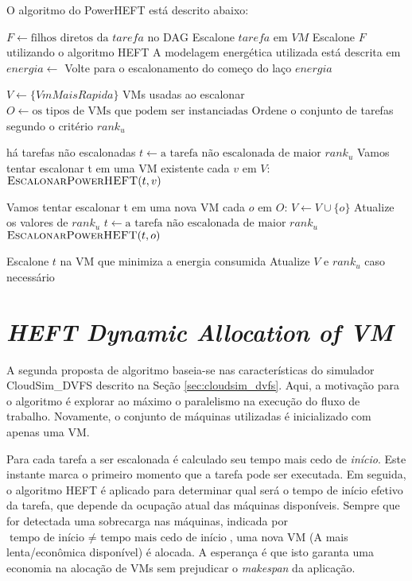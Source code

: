 O algoritmo do PowerHEFT está descrito abaixo:

\begin{codebox}
	\li $F \gets \text{filhos diretos da } tarefa \text{ no DAG}$
    \li Escalone $tarefa$ em $VM$
	\li Escalone $F$ utilizando o algoritmo \textsc{HEFT}
	\zi
	\li \Comment A modelagem energética utilizada está descrita em
    	\cite{guerout:energy_aware_simulation}
	\li $energia \gets$ 
		\li Volte para o escalonamento do começo do laço
	\li \Return $energia$
\end{codebox}


\begin{codebox}
	\li $V \gets \{VmMaisRapida\}$ \Comment VMs usadas ao escalonar
	\li $O \gets \text{os tipos de VMs que podem ser instanciadas}$
	\li Ordene o conjunto de tarefas segundo o critério $rank_u$
   
	\li \While há tarefas não escalonadas
		\li \Do $t \gets \text{a tarefa não escalonada de maior } rank_u$
		\zi
	    \li \Comment Vamos tentar escalonar t em uma VM existente
	    \li \For cada $v$ em $V$:
		    \li \Do	$\textnormal{\scshape EscalonarPowerHEFT}(t, v)$
	    \End
	    
	    \zi
	    \li \Comment Vamos tentar escalonar t em uma nova VM
	    \li \For cada $o$ em $O$:
		    \li \Do	$V \gets V \cup \{o\}$
		    \li Atualize os valores de $rank_u$
		    \li $t \gets \text{a tarefa não escalonada de maior } rank_u$
		    \li $\textnormal{\scshape EscalonarPowerHEFT}(t, o)$
	    \End
	    
	    \li Escalone $t$ na VM que minimiza a energia consumida
	    \li Atualize $V$ e $rank_u$ caso necessário
	\End
\End
\end{codebox}


\section{\emph{HEFT Dynamic Allocation of VM}} %
\label{sec:heft_davm}

A segunda proposta de algoritmo baseia-se nas características do simulador
CloudSim\_DVFS descrito na Seção \ref{sec:cloudsim_dvfs}. Aqui, a motivação para
o algoritmo é explorar ao máximo o paralelismo na execução do fluxo de trabalho.
Novamente, o conjunto de máquinas utilizadas é inicializado com apenas uma VM.

Para cada tarefa a ser escalonada é calculado seu tempo mais cedo de
\emph{início}. Este instante marca o primeiro momento que a tarefa pode ser
executada. Em seguida, o algoritmo HEFT é aplicado para determinar qual será o
tempo de início efetivo da tarefa, que depende da ocupação atual das máquinas
disponíveis. Sempre que for detectada uma sobrecarga nas máquinas, indicada por
$\text{tempo de início } \neq \text{ tempo mais cedo de início}$, uma nova VM (A
mais lenta/econômica disponível) é alocada. A esperança é que isto garanta uma
economia na alocação de VMs sem prejudicar o \emph{makespan} da aplicação.

